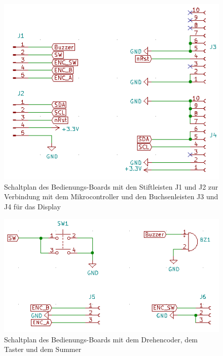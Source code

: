 \begin{figure}[H] %
\includegraphics[width=.75\textwidth]{sec6/images/Display_PCB} 
\centering
\captionsetup{width=.95\textwidth}
\caption[Schaltplan des Bedienungs-Boards 1]{Schaltplan des Bedienungs-Boards mit den Stiftleisten J1 und J2 zur Verbindung mit dem Mikrocontroller und den Buchsenleisten J3 und J4 für das Display}\centering
\label{fig:BedienungsBoard1}
\end{figure}

\begin{figure}[H] %
\includegraphics[width=.90\textwidth]{sec6/images/Display_PCB2} 
\centering
\captionsetup{width=.95\textwidth}
\caption[Schaltplan des Bedienungs-Boards 2]{Schaltplan des Bedienungs-Boards mit dem Drehencoder, dem Taster und dem Summer}\centering
\label{fig:BedienungsBoard2}
\end{figure}

